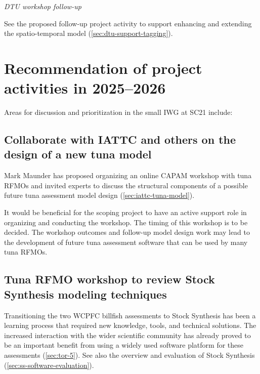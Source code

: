 \documentclass{SCreport}
\begin{document}
\vspace{2ex}

\textit{DTU workshop follow-up}

See the proposed follow-up project activity to support enhancing and extending
the spatio-temporal model (\autoref{sec:dtu-support-tagging}).

\vspace{2ex}
\newpage

\section{Recommendation of project activities in 2025--2026}

Areas for discussion and prioritization in the small IWG at SC21 include:

\vspace{0.5ex}

\subsection{Collaborate with IATTC and others on the design of a new tuna model}
\label{sec:capam-online-workshop}

Mark Maunder has proposed organizing an online CAPAM workshop with tuna RFMOs
and invited experts to discuss the structural components of a possible future
tuna assessment model design (\autoref{sec:iattc-tuna-model}).

It would be beneficial for the scoping project to have an active support role in
organizing and conducting the workshop. The timing of this workshop is to be
decided. The workshop outcomes and follow-up model design work may lead to the
development of future tuna assessment software that can be used by many tuna
RFMOs.

\vspace{2ex}

\subsection{Tuna RFMO workshop to review Stock Synthesis modeling techniques}
\label{sec:ss-modeling-techniques}

Transitioning the two WCPFC billfish assessments to Stock Synthesis has been a
learning process that required new knowledge, tools, and technical solutions.
The increased interaction with the wider scientific community has already proved
to be an important benefit from using a widely used software platform for these
assessments (\autoref{sec:tor-5}). See also the overview and evaluation of Stock
Synthesis (\autoref{sec:ss-software-evaluation}).
\end{document}
